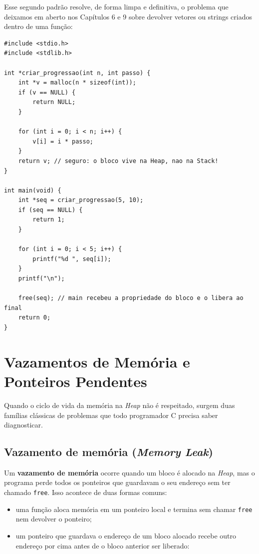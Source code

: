 Esse segundo padrão resolve, de forma limpa e definitiva, o problema que deixamos em aberto nos Capítulos 6 e 9 sobre devolver vetores ou strings criados dentro de uma função:

\begin{lstlisting}
#include <stdio.h>
#include <stdlib.h>

int *criar_progressao(int n, int passo) {
    int *v = malloc(n * sizeof(int));
    if (v == NULL) {
        return NULL;
    }

    for (int i = 0; i < n; i++) {
        v[i] = i * passo;
    }
    return v; // seguro: o bloco vive na Heap, nao na Stack!
}

int main(void) {
    int *seq = criar_progressao(5, 10);
    if (seq == NULL) {
        return 1;
    }

    for (int i = 0; i < 5; i++) {
        printf("%d ", seq[i]);
    }
    printf("\n");

    free(seq); // main recebeu a propriedade do bloco e o libera ao final
    return 0;
}
\end{lstlisting}

\section{Vazamentos de Memória e Ponteiros Pendentes}
\label{sec:vazamentos-ponteiros-pendentes}

Quando o ciclo de vida da memória na \textit{Heap} não é respeitado, surgem duas famílias clássicas de problemas que todo programador C precisa saber diagnosticar.

\subsection{Vazamento de memória (\textit{Memory Leak})}

Um \textbf{vazamento de memória} ocorre quando um bloco é alocado na \textit{Heap}, mas o programa perde todos os ponteiros que guardavam o seu endereço sem ter chamado \texttt{free}. Isso acontece de duas formas comuns:

\begin{itemize}
    \item uma função aloca memória em um ponteiro local e termina sem chamar \texttt{free} nem devolver o ponteiro;
    \item um ponteiro que guardava o endereço de um bloco alocado recebe outro endereço por cima antes de o bloco anterior ser liberado:
\end{itemize}

